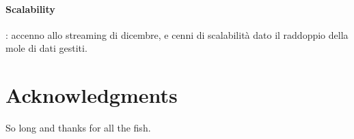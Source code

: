 \documentclass[fleqn,10pt]{SelfArx} %
\begin{document}
\paragraph{Scalability}: accenno allo streaming di dicembre, e cenni di scalabilità dato il raddoppio della mole di dati gestiti.

\section*{Acknowledgments} %


So long and thanks for all the fish.




\end{document}
